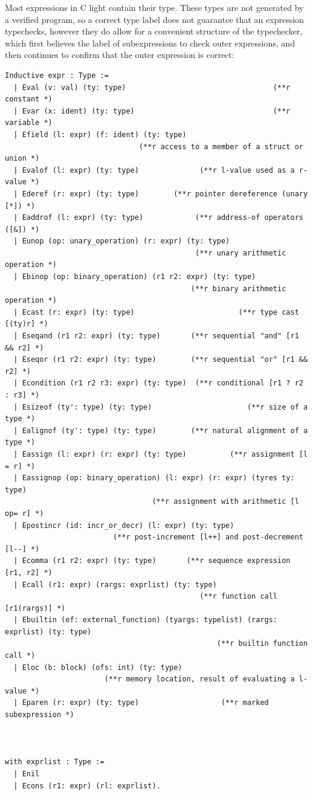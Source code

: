 \documentclass{puthesis}
\begin{document}
Most expressions in C light contain their type. These types are not
generated by a verified program, so a correct type label does not
guarantee that an expression typechecks, however they do allow for a
convenient structure of the typechecker, which first believes the
label of subexpressions to check outer expressions, and then continues
to confirm that the outer expression is correct:
\begin{singlespace}
\begin{lstlisting}
Inductive expr : Type :=
  | Eval (v: val) (ty: type)                                  (**r constant *)
  | Evar (x: ident) (ty: type)                                (**r variable *)
  | Efield (l: expr) (f: ident) (ty: type)
                               (**r access to a member of a struct or union *)
  | Evalof (l: expr) (ty: type)              (**r l-value used as a r-value *)
  | Ederef (r: expr) (ty: type)        (**r pointer dereference (unary [*]) *)
  | Eaddrof (l: expr) (ty: type)            (**r address-of operators ([&]) *)
  | Eunop (op: unary_operation) (r: expr) (ty: type)
                                            (**r unary arithmetic operation *)
  | Ebinop (op: binary_operation) (r1 r2: expr) (ty: type)
                                           (**r binary arithmetic operation *)
  | Ecast (r: expr) (ty: type)                        (**r type cast [(ty)r] *)
  | Eseqand (r1 r2: expr) (ty: type)       (**r sequential "and" [r1 && r2] *)
  | Eseqor (r1 r2: expr) (ty: type)        (**r sequential "or" [r1 && r2] *)
  | Econdition (r1 r2 r3: expr) (ty: type)  (**r conditional [r1 ? r2 : r3] *)
  | Esizeof (ty': type) (ty: type)                      (**r size of a type *)
  | Ealignof (ty': type) (ty: type)        (**r natural alignment of a type *)
  | Eassign (l: expr) (r: expr) (ty: type)          (**r assignment [l = r] *)
  | Eassignop (op: binary_operation) (l: expr) (r: expr) (tyres ty: type)
                                  (**r assignment with arithmetic [l op= r] *)
  | Epostincr (id: incr_or_decr) (l: expr) (ty: type)
                         (**r post-increment [l++] and post-decrement [l--] *)
  | Ecomma (r1 r2: expr) (ty: type)       (**r sequence expression [r1, r2] *)
  | Ecall (r1: expr) (rargs: exprlist) (ty: type)
                                             (**r function call [r1(rargs)] *)
  | Ebuiltin (ef: external_function) (tyargs: typelist) (rargs: exprlist) (ty: type)
                                                 (**r builtin function call *)
  | Eloc (b: block) (ofs: int) (ty: type)
                       (**r memory location, result of evaluating a l-value *)
  | Eparen (r: expr) (ty: type)                   (**r marked subexpression *)



with exprlist : Type :=
  | Enil
  | Econs (r1: expr) (rl: exprlist).
\end{lstlisting}
\end{singlespace}
\end{document}
